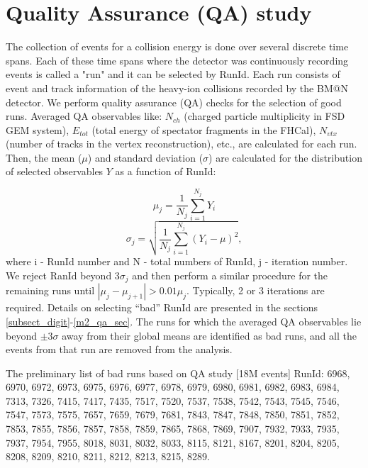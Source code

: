 \section{Quality Assurance (QA) study}

    The collection of events for a collision energy is done over several discrete time spans. 
    Each of these time spans where the detector was continuously recording events is called a "run" and it can be selected by RunId. 
    Each run consists of event and track information of the heavy-ion collisions recorded by the BM@N detector. We perform quality assurance (QA) checks for the selection of good runs. Averaged QA observables like: $N_{ch}$ (charged particle multiplicity in FSD GEM system), $E_{tot}$ (total energy of spectator fragments in the FHCal), $N_{vtx}$ (number of tracks in the vertex reconstruction), etc., are calculated for each run. Then, the mean ($\mu$) and standard deviation ($\sigma$) are calculated for the distribution of selected observables $Y$ as a function of RunId:

    \begin{equation}\label{QaRunByRun_mu}
        \mu_{j} = \frac{1}{N_{j}} \sum_{i=1}^{N_{j}} Y_i  
    \end{equation}
    \begin{equation}\label{QaRunByRun_sigma}
        \sigma_{j} = \sqrt{ \frac{1}{N_{j}} \sum_{i=1}^{N_{j}} (Y_i - \mu)^{2} },
    \end{equation}
    where i - RunId number and N  - total numbers of RunId, j - iteration number. 
    We reject RanId beyond 3$\sigma_{j}$ and then perform a similar procedure for the remaining runs until $|\mu_{j}-\mu_{j+1}| > 0.01\mu_{j}$. Typically, 2 or 3 iterations are required.
    Details on selecting “bad” RunId are presented in the sections \ref{subsect_digit}-\ref{m2_qa_sec}. The runs for which the averaged QA observables lie beyond $\pm 3\sigma$ away from their global means are identified as bad runs, and all the events from that run are removed from the analysis.



    The preliminary list of bad runs based on QA study [18M events] RunId: 6968, 6970, 6972, 6973, 6975, 6976, 6977, 6978, 6979, 6980, 6981, 6982, 6983, 6984, 7313, 7326, 7415, 7417, 7435, 7517, 7520, 7537, 7538, 7542, 7543, 7545, 7546, 7547, 7573, 7575, 7657, 7659, 7679, 7681, 7843, 7847, 7848, 7850, 7851, 7852, 7853, 7855, 7856, 7857, 7858, 7859, 7865, 7868, 7869, 7907, 7932, 7933, 7935, 7937, 7954, 7955, 8018, 8031, 8032, 8033, 8115, 8121, 8167, 8201, 8204, 8205, 8208, 8209, 8210, 8211, 8212, 8213, 8215, 8289.




